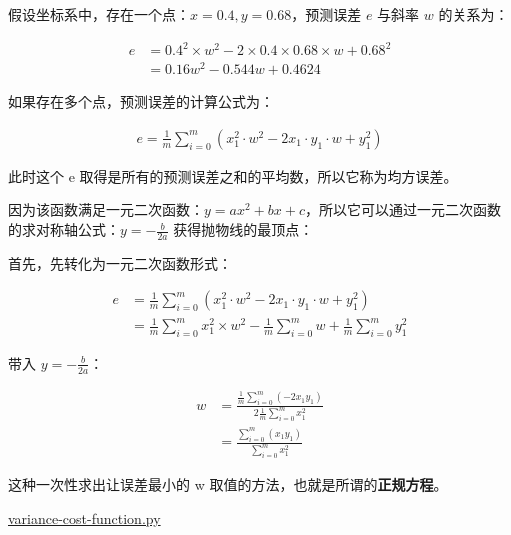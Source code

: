 \documentclass{ctexart}
\begin{document}
假设坐标系中，存在一个点：$x = 0.4, y = 0.68$，预测误差 $e$ 与斜率 $w$ 的关系为：

\[
	\begin{aligned}
		e & = 0.4^2 \times w^2 - 2 \times 0.4 \times 0.68 \times w + 0.68^2 \\
		  & = 0.16w^2 - 0.544w + 0.4624
	\end{aligned}
\]

\begin{center}
\end{center}

如果存在多个点，预测误差的计算公式为：

\[
	\begin{aligned}
		e = \frac{1}{m} \sum^{m}_{i = 0} (x_1^2 \cdot w^2 - 2x_1 \cdot y_1 \cdot w + y_1^2)
	\end{aligned}
\]

此时这个 e 取得是所有的预测误差之和的平均数，所以它称为均方误差。

因为该函数满足一元二次函数：$y = ax^2 + bx + c$，所以它可以通过一元二次函数的求对称轴公式：$y = -\frac{b}{2a}$ 获得抛物线的最顶点：

首先，先转化为一元二次函数形式：

\[
	\begin{aligned}
		e & = \frac{1}{m} \sum^{m}_{i = 0} (x_1^2 \cdot w^2 - 2x_1 \cdot y_1 \cdot w + y_1^2)                                     \\
		  & = \frac{1}{m} \sum^{m}_{i = 0} x_1^2 \times w^2 - \frac{1}{m} \sum^{m}_{i = 0} w + \frac{1}{m} \sum^{m}_{i = 0} y_1^2
	\end{aligned}
\]

带入 $y = -\frac{b}{2a}$：

\[
	\begin{aligned}
        w & = \frac {
			\frac{1}{m} \sum\limits^{m}_{i = 0} (-2x_1y_1)
		}{
			2\frac{1}{m} \sum\limits^{m}_{i = 0} x_1^2
		}            \\
		 & = \frac {
			\sum\limits^{m}_{i = 0} (x_1y_1)
		} {
			\sum\limits^{m}_{i = 0} x_1^2
		}
	\end{aligned}
\]

这种一次性求出让误差最小的 w 取值的方法，也就是所谓的\textbf{正规方程}。

\url{variance-cost-function.py}
\end{document}
